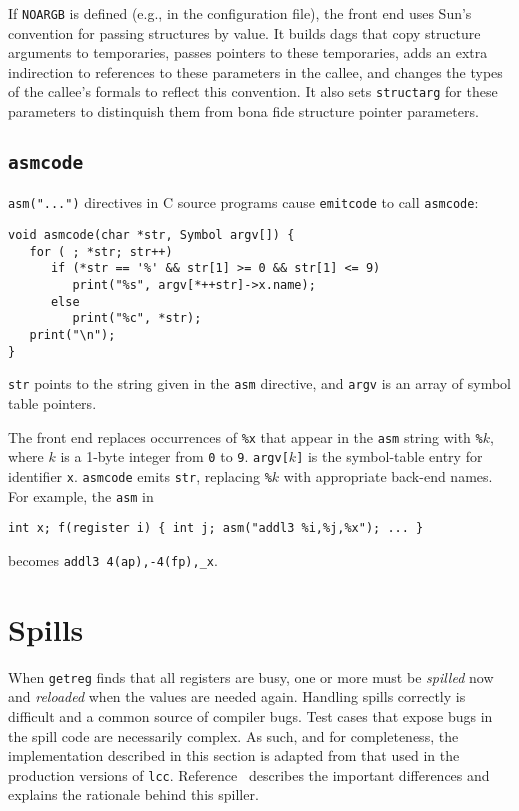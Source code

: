 If \verb|NOARGB| is defined (e.g., in the configuration file),
the front end uses Sun's convention for passing structures by value.
It builds dags that copy structure arguments to temporaries,
passes pointers to these temporaries, adds an extra indirection
to references to these parameters in the callee, and changes
the types of the callee's formals to reflect this convention.
It also sets \verb|structarg| for these parameters to distinquish
them from bona fide structure pointer parameters.

\subsection{\tt asmcode}

\label{asmcode}
\verb|asm("...")| directives in C source programs cause
\verb|emitcode| to call \verb|asmcode|:
\begin{verbatim}
void asmcode(char *str, Symbol argv[]) {
   for ( ; *str; str++)
      if (*str == '%' && str[1] >= 0 && str[1] <= 9)
         print("%s", argv[*++str]->x.name);
      else
         print("%c", *str);
   print("\n");
}
\end{verbatim}
\verb|str| points to the string given in the \verb|asm| directive,
and \verb|argv| is an array of symbol table pointers.

The front end replaces occurrences of \verb|%x|
that appear in the \verb|asm| string
with \verb|%|$k$, where $k$ is a 1-byte integer from \verb|0| to \verb|9|.
\verb|argv[|$k$\verb|]| is the symbol-table entry for identifier \verb|x|.
\verb|asmcode| emits \verb|str|, replacing \verb|%|$k$ with appropriate
back-end names.
For example, the \verb|asm| in
\begin{verbatim}
int x; f(register i) { int j; asm("addl3 %i,%j,%x"); ... }
\end{verbatim}
becomes \verb|addl3 4(ap),-4(fp),_x|.

\section{Spills}

\label{spills}
When \verb|getreg| finds that all registers are busy,
one or more must be {\em spilled} now and {\em reloaded}
when the values are needed again.
Handling spills correctly is difficult and a common
source of compiler bugs. Test cases that expose
bugs in the spill code are necessarily complex.
As such, and for completeness,
the implementation described in this section is adapted
from that used in the production versions of \verb|lcc|.
Reference~\cite{fraser:hanson:92} describes the important
differences and explains the rationale behind this spiller.

